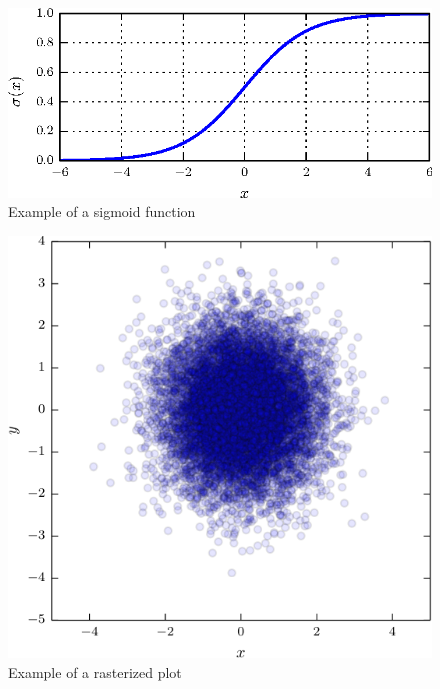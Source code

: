 \documentclass{article}
\begin{document}
\begin{figure}
	\centering
	\includegraphics{figure.eps}
	\caption{Example of a sigmoid function}
\end{figure}

\begin{figure}
	\centering
	\includegraphics{figure_rasterized.pdf}
	\caption{Example of a rasterized plot}
\end{figure}
\end{document}
